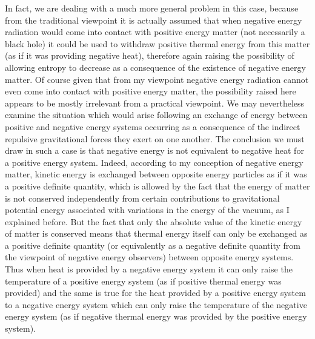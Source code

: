 \documentclass[notitlepage,12pt]{report}
\begin{document}
In fact, we are dealing with a much more general problem in this case, because from the traditional viewpoint it is actually assumed that when negative energy radiation would come into contact with positive energy matter (not necessarily a black hole) it could be used to withdraw positive thermal energy from this matter (as if it was providing negative heat), therefore again raising the possibility of allowing entropy to decrease as a consequence of the existence of negative energy matter. Of course given that from my viewpoint negative energy radiation cannot even come into contact with positive energy matter, the possibility raised here appears to be mostly irrelevant from a practical viewpoint. We may nevertheless examine the situation which would arise following an exchange of energy between positive and negative energy systems occurring as a consequence of the indirect repulsive gravitational forces they exert on one another. The conclusion we must draw in such a case is that negative energy is not equivalent to negative heat for a positive energy system. Indeed, according to my conception of negative energy matter, kinetic energy is exchanged between opposite energy particles as if it was a positive definite quantity, which is allowed by the fact that the energy of matter is not conserved independently from certain contributions to gravitational potential energy associated with variations in the energy of the vacuum, as I explained before. But the fact that only the absolute value of the kinetic energy of matter is conserved means that thermal energy itself can only be exchanged as a positive definite quantity (or equivalently as a negative definite quantity from the viewpoint of negative energy observers) between opposite energy systems. Thus when heat is provided by a negative energy system it can only raise the temperature of a positive energy system (as if positive thermal energy was provided) and the same is true for the heat provided by a positive energy system to a negative energy system which can only raise the temperature of the negative energy system (as if negative thermal energy was provided by the positive energy system).
\end{document}
